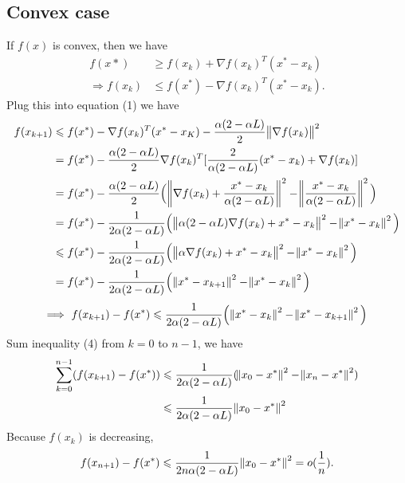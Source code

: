 \documentclass[11pt]{article}
\begin{document}
\subsection{Convex case}
If $f(x)$ is convex, then we have 
\begin{equation}\begin{split}
f(x*)&\geqslant f(x_k)+\nabla f(x_k)^T(x^*-x_k) \\ 
\Rightarrow f(x_k) &\leqslant f(x^*) - \nabla f(x_k)^T (x^* - x_k).
\end{split}\nonumber\end{equation} 
Plug this into equation (1) we have 
\begin{equation}\begin{split} 
f(x_{k+1}) &\leqslant f(x^*) - \nabla f(x_k)^T(x^*-x_K) - \frac{\alpha(2-\alpha L)}2\norm{\nabla f(x_k)}^2 \\
&=f(x^*) - \frac{\alpha(2-\alpha L)}2\nabla f(x_k)^T[\frac2{\alpha(2-\alpha L)}(x^*-x_k)+\nabla f(x_k)] \\
&=f(x^*) - \frac{\alpha(2-\alpha L)}2\Big(\norm{\nabla f(x_k) +\frac{x^*-x_k}{\alpha(2-\alpha L)}}^2 - \norm{\frac{x^*-x_k}{\alpha(2-\alpha L)}}^2\Big) \\
&=f(x^*) - \frac1{2\alpha(2-\alpha L)}\Big( \norm{\alpha(2-\alpha L)\nabla f(x_k) + x^* - x_k}^2 - \norm{x^* - x_k}^2  \Big) \\
&\leqslant f(x^*) - \frac1{2\alpha(2-\alpha L)}\Big(\norm{\alpha\nabla f(x_k) + x^* - x_k}^2 - \norm{x^* - x_k}^2 \Big)\\
&= f(x^*) - \frac1{2\alpha(2-\alpha L)}\Big( \norm{x^*-x_{k+1}}^2 - \norm{x^* - x_k}^2  \Big)\\
\end{split}\nonumber\end{equation} 
\begin{equation}\begin{split} 
\Longrightarrow\,\, f(x_{k+1}) - f(x^*) \leqslant  \frac1{2\alpha(2-\alpha L)}\Big( \norm{x^*-x_k}^2 - \norm{x^* - x_{k+1}}^2  \Big)
\end{split}\end{equation} 
Sum inequality (4) from $k=0$ to $n-1$, we have
\begin{equation}\begin{split}
\sum_{k=0}^{n-1}(f(x_{k+1}) - f(x^*)) &\leqslant  \frac1{2\alpha(2-\alpha L)}(\norm{x_0-x^*}^2 - \norm{x_n-x^*}^2) \\
&\leqslant  \frac1{2\alpha(2-\alpha L)} \norm{x_0 - x^*}^2
\end{split}\end{equation}
Because $f(x_k)$ is decreasing, 
$$f(x_{n+1}) - f(x^*)\leqslant \frac1{2n\alpha(2-\alpha L)}\norm{x_0 - x^*}^2 = o(\frac1n).$$
\end{document}
